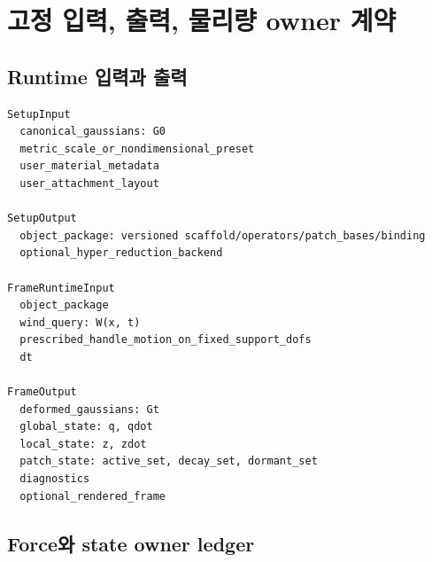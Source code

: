 \documentclass[10pt,a4paper]{article}
\begin{document}
\section{고정 입력, 출력, 물리량 owner 계약}

\subsection{Runtime 입력과 출력}

\begin{lstlisting}
SetupInput
  canonical_gaussians: G0
  metric_scale_or_nondimensional_preset
  user_material_metadata
  user_attachment_layout

SetupOutput
  object_package: versioned scaffold/operators/patch_bases/binding
  optional_hyper_reduction_backend

FrameRuntimeInput
  object_package
  wind_query: W(x, t)
  prescribed_handle_motion_on_fixed_support_dofs
  dt

FrameOutput
  deformed_gaussians: Gt
  global_state: q, qdot
  local_state: z, zdot
  patch_state: active_set, decay_set, dormant_set
  diagnostics
  optional_rendered_frame
\end{lstlisting}

\subsection{Force와 state owner ledger}
\end{document}
